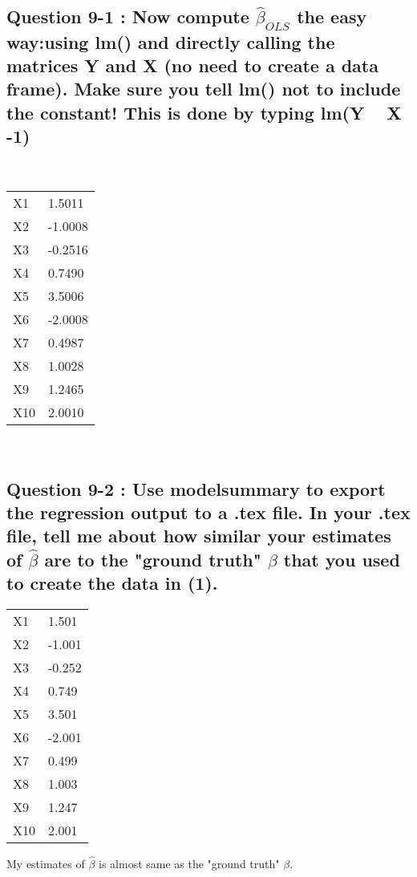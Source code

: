 \documentclass[12pt, letterpaper]{article}
\begin{document}
\subsection*{Question 9-1 : Now compute $\hat{\beta}_{OLS}$ the easy way:using lm() and directly calling the matrices Y and X (no need to create a data frame). Make sure you tell lm() not to include the constant! This is done by typing lm(Y ~ X -1)}
\\
\begin{table}[h]
\begin{tabular}{ll}
X1  & 1.5011  \\
X2  & -1.0008 \\
X3  & -0.2516 \\
X4  & 0.7490  \\
X5  & 3.5006  \\
X6  & -2.0008 \\
X7  & 0.4987  \\
X8  & 1.0028  \\
X9  & 1.2465  \\
X10 & 2.0010 
\end{tabular}
\end{table}
\\
\newpage
\subsection*{Question 9-2 : Use modelsummary to export the regression output to a .tex file. In your .tex file, tell me about how similar your estimates of $\hat{\beta}$ are to the "ground truth" $\beta$ that you used to create the data in (1).}
\begin{table}[h]
\begin{tabular}{ll}
X1  & 1.501  \\
X2  & -1.001 \\
X3  & -0.252 \\
X4  & 0.749  \\
X5  & 3.501  \\
X6  & -2.001 \\
X7  & 0.499  \\
X8  & 1.003  \\
X9  & 1.247  \\
X10 & 2.001 
\end{tabular}
\end{table}
My estimates of $\hat{\beta}$ is almost same as the "ground truth" $\beta$.  
\end{document}
